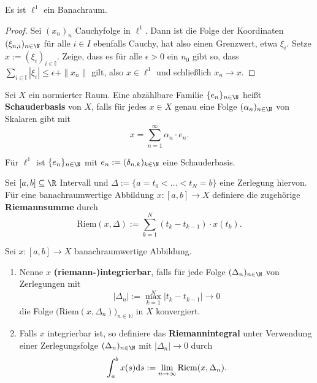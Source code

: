\begin{satz}
  Es ist $\ell^1$ ein Banachraum.
\end{satz}

\begin{proof}
  Sei $(x_n)_n$ Cauchyfolge in $\ell^1$. Dann ist die Folge der Koordinaten $(\xi_{n,i})_{n\in \N}$ für alle $i\in I$ ebenfalls Cauchy, hat also einen Grenzwert, etwa $\xi_i$. Setze $x:=(\xi_i)_{i\in \mathbb I}$. Zeige, dass es für alle $\epsilon>0$ ein $n_0$ gibt so, dass $\sum_{i\in\mathbb I}|\xi_i|\leq\epsilon + \|x_n\|$ gilt, also $x\in\ell^1$ und schließlich $x_n\to x$. 
\end{proof}

\begin{defi}[Schauderbasis]
  Sei $X$ ein normierter Raum. Eine abzählbare Familie $\{e_n\}_{n\in\N}$ heißt \textbf{Schauderbasis} von $X$, falls für jedes $x\in X$ genau eine Folge $(\alpha_n)_{n\in \N}$ von Skalaren gibt mit $$x=\sum_{n=1}^\infty \alpha_n\cdot e_n.$$
\end{defi}

\begin{satz}
  Für $\ell^1$ ist $\{e_n\}_{n\in\N}$ mit $e_n:=(\delta_{n,k})_{k\in\N}$ eine  Schauderbasis.
\end{satz}


\begin{defi}[Riemannsumme]
  Sei $[a,b]\subseteq \R$ Intervall und $\Delta:=\{a=t_0< \dots <t_N=b\}$ eine Zerlegung hiervon. Für eine banachraumwertige Abbildung $x\colon[a,b]\to X$  definiere die zugehörige \textbf{Riemannsumme} durch $$\text{Riem}(x,\Delta):=\sum_{k=1}^N (t_k-t_{k-1})\cdot x(t_k).$$
\end{defi}

\begin{konstr}[Riemannintegral]
  Sei $x\colon[a,b]\to X $
  banachraumwertige Abbildung.
  \begin{enumerate}
      \item Nenne $x$ \textbf{(riemann-)integrierbar}, falls für jede Folge $(\Delta_n)_{n\in \N}$ von Zerlegungen mit $$|\Delta_n|:=\max_{k=1}^N|t_k-t_{k-1}|\to 0$$ die Folge $\big(\text{Riem}(x,\Delta_n)\big)_{n\in\mathbb N}$ in $X$ konvergiert.
      \item Falls $x$ integrierbar ist, so definiere das \textbf{Riemannintegral} unter Verwendung einer Zerlegungsfolge $(\Delta_n)_{n\in \N}$ mit $|\Delta_n|\to 0$ durch $$\int_a^b x(s)\text ds:=\lim_{n\to\infty}\text{Riem}(x,\Delta_n).$$
  \end{enumerate}
\end{konstr}


